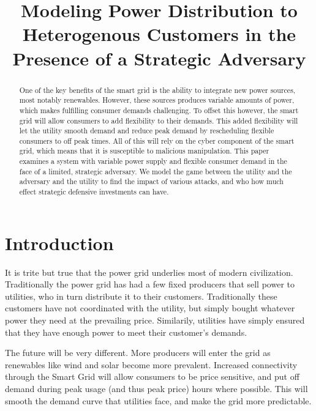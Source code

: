 \documentclass[conference]{IEEEtran}
\begin{document}
\title{Modeling Power Distribution to Heterogenous Customers in the Presence of a Strategic Adversary}

\author{
}

\maketitle

\begin{abstract}
One of the key benefits of the smart grid is the ability to integrate new power sources, most notably renewables.  However, these sources produces variable amounts of power, which makes fulfilling consumer demands challenging.  To offset this however, the smart grid will allow consumers to add flexibility to their demands.  This added flexibility will let the utility smooth demand and reduce peak demand by rescheduling flexible consumers to off peak times.  All of this will rely on the cyber component of the smart grid, which means that it is susceptible to malicious manipulation.  This paper examines a system with variable power supply and flexible consumer demand in the face of a limited, strategic adversary.  We model the game between the utility and the adversary and the utility to find the impact of various attacks, and who how much effect strategic defensive investments can have.

\end{abstract}

\section{Introduction}
\label{Introduction}

It is trite but true that the power grid underlies most of modern civilization.  Traditionally the power grid has had a 
few fixed producers that sell power to utilities, who in turn distribute it to their customers.  Traditionally these 
customers have not coordinated with the utility, but simply bought whatever power they need at the prevailing price.  
Similarily, utilities have simply ensured that they have enough power to meet their customer's demands.  

The future will be very different.  More producers will enter the grid as renewables like wind and solar become more
prevalent.  Increased connectivity through the Smart Grid will allow consumers to be price sensitive, and put off 
demand during peak usage (and thus peak price) hours where possible.  This will smooth the demand curve that utilities face,
and make the grid more predictable.
\end{document}
